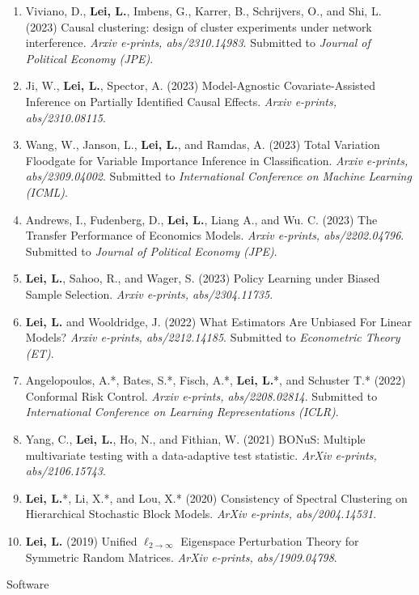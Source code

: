 \documentclass{article}
\newcommand{\red}[1]{{\color{red} #1}}
\begin{document}
\begin{enumerate}
\item \red{Viviano, D., \textbf{Lei, L.}, Imbens, G., Karrer, B., Schrijvers, O., and Shi, L. (2023) Causal clustering: design of cluster experiments under network interference. \emph{Arxiv e-prints, abs/2310.14983}. Submitted to \emph{Journal of Political Economy (JPE)}. }
\item \red{Ji, W., \textbf{Lei, L.}, Spector, A. (2023) Model-Agnostic Covariate-Assisted Inference on Partially Identified Causal Effects. \emph{Arxiv e-prints, abs/2310.08115}. }
\item \red{Wang, W., Janson, L., \textbf{Lei, L.}, and Ramdas, A. (2023) Total Variation Floodgate for Variable Importance Inference in Classification. \emph{Arxiv e-prints, abs/2309.04002}. Submitted to \emph{International Conference on Machine Learning (ICML)}.}
\item \red{Andrews, I., Fudenberg, D., \textbf{Lei, L.}, Liang A., and Wu. C. (2023) The Transfer Performance of Economics Models. \emph{Arxiv e-prints, abs/2202.04796}. Submitted to \emph{Journal of Political Economy (JPE)}. }
\item \red{\textbf{Lei, L.}, Sahoo, R., and Wager, S. (2023) Policy Learning under Biased Sample Selection. \emph{Arxiv e-prints, abs/2304.11735}.}
\item \red{\textbf{Lei, L.} and Wooldridge, J. (2022) What Estimators Are Unbiased For Linear Models? \emph{Arxiv e-prints, abs/2212.14185}. Submitted to \emph{Econometric Theory (ET)}.}
\item \red{Angelopoulos, A.*, Bates, S.*, Fisch, A.*, \textbf{Lei, L.}*, and Schuster T.* (2022) Conformal Risk Control. \emph{Arxiv e-prints, abs/2208.02814}. Submitted to \emph{International Conference on Learning Representations (ICLR)}.}
\item Yang, C., \textbf{Lei, L.}, Ho, N., and Fithian, W. (2021) BONuS: Multiple multivariate testing with a data-adaptive test statistic. \emph{ArXiv e-prints, abs/2106.15743}.
\item \textbf{Lei, L.}*, Li, X.*, and Lou, X.* (2020) Consistency of Spectral Clustering on Hierarchical Stochastic Block Models. \emph{ArXiv e-prints, abs/2004.14531}.
\item \textbf{Lei, L.} (2019) Unified $\ell_{2\rightarrow\infty}$ Eigenspace Perturbation Theory for Symmetric Random Matrices. \emph{ArXiv e-prints, abs/1909.04798}.
\end{enumerate}

\begin{large}
\noindent Software
\end{large}
\end{document}
